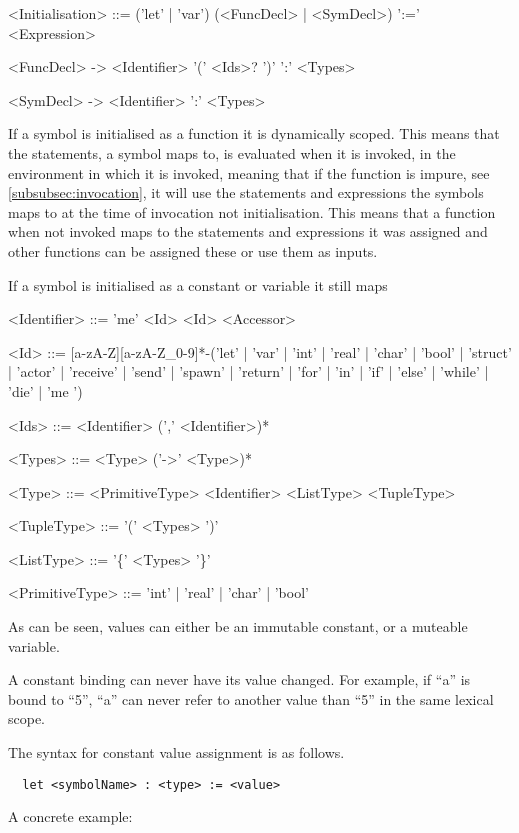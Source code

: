\begin{grammar}
<Initialisation> ::= ('let' | 'var') (<FuncDecl> | <SymDecl>) ':=' <Expression>

<FuncDecl> -> <Identifier> '(' <Ids>? ')' ':' <Types>

<SymDecl> -> <Identifier> ':' <Types>
\end{grammar}

If a symbol is initialised as a function it is dynamically scoped. This means that the statements, a symbol maps to, is evaluated when it is invoked, in the environment in which it is invoked, meaning that if the function is impure, see \cref{subsubsec:invocation}, it will use the statements and expressions the symbols maps to at the time of invocation not initialisation. This means that a function when not invoked maps to the statements and expressions it was assigned and other functions can be assigned these or use them as inputs.

If a symbol is initialised as a constant or variable it still maps

\begin{grammar}
<Identifier> ::= 'me'
 \alt <Id>
 \alt <Id> <Accessor>

<Id> ::= [a-zA-Z][a-zA-Z\_0-9]*-('let' | 'var' | 'int' | 'real' | 'char' | 'bool' | 'struct' | 'actor' | 'receive' | 'send' | 'spawn' | 'return' | 'for' | 'in' | 'if' | 'else' | 'while' | 'die' | 'me ')

<Ids> ::= <Identifier> (',' <Identifier>)*

<Types> ::= <Type> ('->' <Type>)*

<Type> ::= <PrimitiveType>
 \alt <Identifier>
 \alt <ListType>
 \alt <TupleType>

<TupleType> ::= '(' <Types> ')'

<ListType> ::= '\{' <Types> '\}'

<PrimitiveType> ::= 'int' | 'real' | 'char' | 'bool'
\end{grammar}

As can be seen, values can either be an immutable constant, or a muteable variable.

A constant binding can never have its value changed. For example, if \enquote{a} is bound to \enquote{5}, \enquote{a} can never refer to another value than \enquote{5} in the same lexical scope. 

The syntax for constant value assignment is as follows.
\begin{verbatim}
  let <symbolName> : <type> := <value>
\end{verbatim}
A concrete example:

